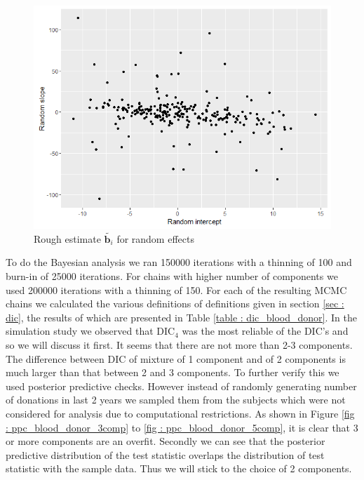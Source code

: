 \begin{figure}
	\centering
	\includegraphics[scale=0.5]{mainmatter/chapter_6_blood_donor/rough_estimate_random_effects.png}
	\caption{Rough estimate $\tilde{\boldsymbol{b}_i}$ for random effects}
	\label{fig : rough_idea_blood_donor}
\end{figure}

To do the Bayesian analysis we ran 150000 iterations with a thinning of 100 and burn-in of 25000 iterations. For chains with higher number of components we used 200000 iterations with a thinning of 150. For each of the resulting MCMC chains we calculated the various definitions of definitions given in section \ref{sec : dic}, the results of which are presented in Table \ref{table : dic_blood_donor}. In the simulation study we observed that $\text{DIC}_4$ was the most reliable of the DIC's and so we will discuss it first. It seems that there are not more than 2-3 components. The difference between DIC of mixture of 1 component and of 2 components is much larger than that between 2 and 3 components. To further verify this we used posterior predictive checks. However instead of randomly generating number of donations in last 2 years we sampled them from the subjects which were not considered for analysis due to computational restrictions. As shown in Figure \ref{fig : ppc_blood_donor_3comp} to \ref{fig : ppc_blood_donor_5comp}, it is clear that 3 or more components are an overfit. Secondly we can see that the posterior predictive distribution of the test statistic overlaps the distribution of test statistic with the sample data. Thus we will stick to the choice of 2 components.\\

